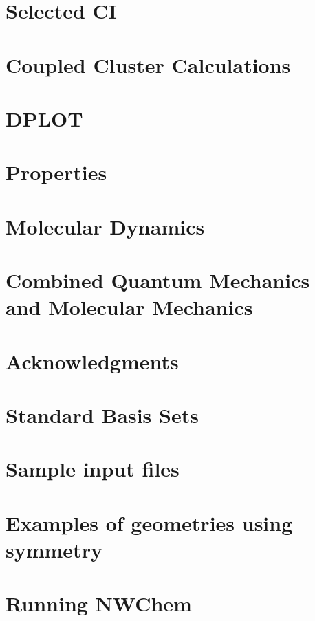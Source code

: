 \section{Selected CI}


\section{Coupled Cluster Calculations}


\section{DPLOT}


\section{Properties}


\section{Molecular Dynamics}


\section{Combined Quantum Mechanics and Molecular Mechanics}


\clearpage
\section{Acknowledgments}

\clearpage

\appendix

\section{Standard Basis Sets}


\section{Sample input files}


\section{Examples of geometries using symmetry}


\section{Running NWChem}



